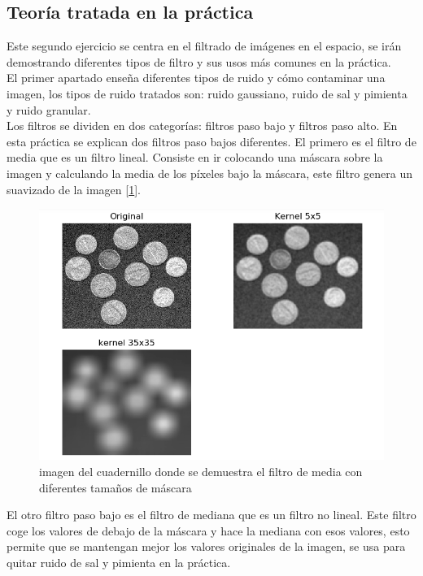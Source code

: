 \documentclass[a4paper,12pt]{report}
\begin{document}
\subsection{Teoría tratada en la práctica}

Este segundo ejercicio se centra en el filtrado de imágenes en el espacio, se irán demostrando diferentes tipos de filtro y sus usos más comunes en la práctica.\\

El primer apartado enseña diferentes tipos de ruido y cómo contaminar una imagen, los tipos de ruido tratados son: ruido gaussiano, ruido de sal y pimienta y ruido granular.\\

Los filtros se dividen en dos categorías: filtros paso bajo y filtros paso alto. En esta práctica se explican dos filtros paso bajos diferentes. El primero es el filtro de media que es un filtro lineal. Consiste en ir colocando una máscara sobre la imagen y calculando la media de los píxeles bajo la máscara, este filtro genera un suavizado de la imagen [\ref{filtromedia}].

\begin{figure}[h]
\centering
\includegraphics[width=1\textwidth]{imagenes/filtromedia}
\caption{imagen del cuadernillo donde se demuestra el filtro de media con diferentes tamaños de máscara}
\label{filtromedia}
\end{figure}

El otro filtro paso bajo es el filtro de mediana que es un filtro no lineal. Este filtro coge los valores de debajo de la máscara y  hace la mediana con esos valores, esto permite que se mantengan mejor los valores originales de la imagen, se usa para quitar ruido de sal y pimienta en la práctica.\\
\end{document}
